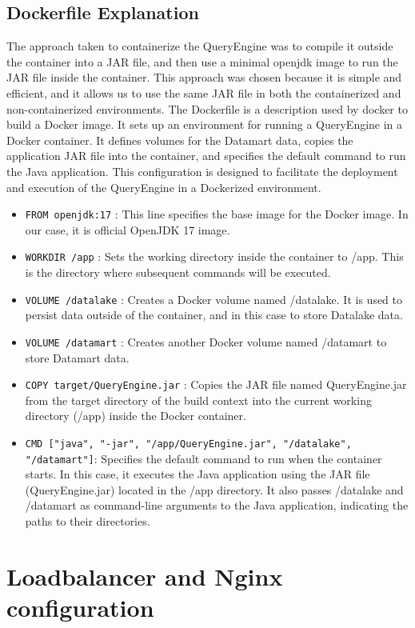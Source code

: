 \documentclass{article}
\begin{document}
\subsection{Dockerfile Explanation}
The approach taken to containerize the QueryEngine was to compile it outside the container into a JAR file, and then use a minimal openjdk image to run the JAR file inside the container.
This approach was chosen because it is simple and efficient, and it allows us to use the same JAR file in both the containerized and non-containerized environments.
The Dockerfile is a description used by docker to build a Docker image.
It sets up an environment for running a QueryEngine in a Docker container.
It defines volumes for the Datamart data, copies the application JAR file into the container, and specifies the default command to run the Java application.
This configuration is designed to facilitate the deployment and execution of the QueryEngine in a Dockerized environment.


\begin{itemize}
\item 
\texttt{FROM openjdk:17} : This line specifies the base image for the Docker image. In our case, it is official OpenJDK 17 image.
\item
\texttt{WORKDIR /app} : Sets the working directory inside the container to /app. This is the directory where subsequent commands will be executed.
\item
\texttt{VOLUME /datalake} :
Creates a Docker volume named /datalake. It is used to persist data outside of the container, and in this case to store Datalake data.
\item
\texttt{VOLUME /datamart} :
Creates another Docker volume named /datamart to store Datamart data.
\item
\texttt{COPY target/QueryEngine.jar} :
Copies the JAR file named QueryEngine.jar from the target directory of the build context into the current working directory (/app) inside the Docker container.
\item
\texttt{CMD ["java", "-jar", "/app/QueryEngine.jar", "/datalake", "/datamart"]}:
Specifies the default command to run when the container starts. In this case, it executes the Java application using the JAR file (QueryEngine.jar) located in the /app directory. It also passes /datalake and /datamart as command-line arguments to the Java application, indicating the paths to their directories.
\end{itemize}


\section{Loadbalancer and Nginx configuration}
\end{document}
